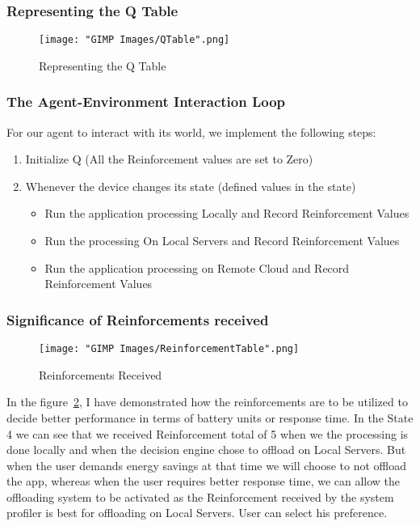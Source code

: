 \documentclass[12pt]{report}
\begin{document}
\subsubsection{Representing the Q Table}

\begin{figure}[h!]
  \centering
  \texttt{[image: "GIMP Images/QTable".png]}
  \caption{Representing the Q Table}
  \label{fig:QTable}
\end{figure}

\subsubsection{The Agent-Environment Interaction Loop}
For our agent to interact with its world, we implement the following steps:
\begin{enumerate}
	\item Initialize Q (All the Reinforcement values are set to Zero)
	\item Whenever the device changes its state (defined values in the state)\begin{itemize}
					\item Run the application processing Locally and Record Reinforcement Values
					\item Run the processing On Local Servers and Record Reinforcement Values
					\item Run the application processing on Remote Cloud and Record Reinforcement Values
					\end{itemize}


\end{enumerate}
\subsubsection{Significance of Reinforcements received}
\begin{figure}[h!]
  \centering
  \texttt{[image: "GIMP Images/ReinforcementTable".png]}
  \caption{Reinforcements Received}
  \label{fig:ReinforcementTable}
\end{figure}

In the figure~\ref{fig:ReinforcementTable}, I have demonstrated how the reinforcements are to be utilized to decide better performance in terms of battery units or response time. In the State 4 we can see that we received Reinforcement total of 5 when we the processing is done locally and when the decision engine chose to offload on Local Servers. But when the user demands energy savings at that time we will choose to not offload the app, whereas when the user requires better response time, we can allow the offloading system to be activated as the Reinforcement received by the system profiler is best for offloading on Local Servers.
User can select his preference.
\end{document}
